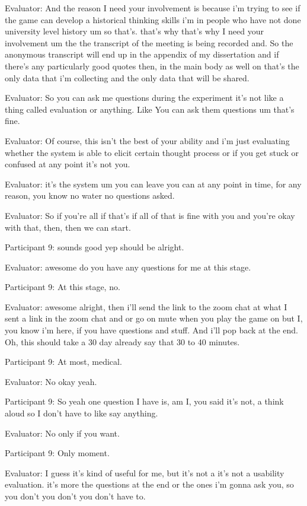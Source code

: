\documentclass{l4proj}
\begin{document}
\begin{appendices}
Evaluator: And the reason I need your involvement is because i'm trying to see if the game can develop a historical thinking skills i'm in people who have not done university level history um so that's. that's why that's why I need your involvement um the the transcript of the meeting is being recorded and. So the anonymous transcript will end up in the appendix of my dissertation and if there's any particularly good quotes then, in the main body as well on that's the only data that i'm collecting and the only data that will be shared.

Evaluator: So you can ask me questions during the experiment it's not like a thing called evaluation or anything. Like You can ask them questions um that's fine.

Evaluator: Of course, this isn't the best of your ability and i'm just evaluating whether the system is able to elicit certain thought process or if you get stuck or confused at any point it's not you.

Evaluator: it's the system um you can leave you can at any point in time, for any reason, you know no water no questions asked.

Evaluator: So if you're all if that's if all of that is fine with you and you're okay with that, then, then we can start.

Participant 9: sounds good yep should be alright.

Evaluator: awesome do you have any questions for me at this stage.

Participant 9: At this stage, no.

Evaluator: awesome alright, then i'll send the link to the zoom chat at what I sent a link in the zoom chat and or go on mute when you play the game on but I, you know i'm here, if you have questions and stuff. And i'll pop back at the end. Oh, this should take a 30 day already say that 30 to 40 minutes.

Participant 9: At most, medical.

Evaluator: No okay yeah.

Participant 9: So yeah one question I have is, am I, you said it's not, a think aloud so I don't have to like say anything.

Evaluator: No only if you want.

Participant 9: Only moment.

Evaluator: I guess it's kind of useful for me, but it's not a it's not a usability evaluation. it's more the questions at the end or the ones i'm gonna ask you, so you don't you don't you don't have to.


\end{appendices}
\end{document}
